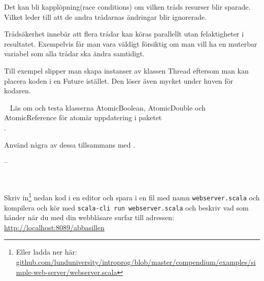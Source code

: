 \SubtaskSolved  {}

\SubtaskSolved  Det kan bli kapplöpning(race conditions) om vilken tråds resurser blir sparade. Vilket leder till att de andra trådarnas ändringar blir ignorerade.

\SubtaskSolved  Trådsäkerhet innebär att flera trådar kan köras parallellt utan felaktigheter i resultatet. Exempelvis får man vara väldigt försiktig om man vill ha en muterbar variabel som alla trådar ska ändra samtidigt.

\SubtaskSolved  Till exempel slipper man skapa instanser av klassen Thread eftersom man kan placera koden i en Future istället. Den löser även mycket under huven för kodaren.


\QUESTEND







\QUESTBEGIN

\Task  \what~ Läs om och testa klasserna AtomicBoolean, AtomicDouble och AtomicReference för atomär uppdatering i paketet \\ .

Använd några av dessa tillsammans med .


\SOLUTION

\TaskSolved --

\QUESTEND






\QUESTBEGIN

\Task  \what~

\Subtask Skriv in\footnote{Eller ladda ner här: \href{https://github.com/lunduniversity/introprog/blob/master/compendium/examples/simple-web-server/webserver.scala}{github.com/lunduniversity/introprog/blob/master/compendium/examples/simple-web-server/webserver.scala}} nedan kod i en editor och spara i en fil med namn \texttt{webserver.scala} och kompilera och kör med \texttt{scala-cli run webserver.scala} och beskriv vad som händer när du med din webbläsare surfar till adressen: \\ \url{http://localhost:8089/abbasillen}


